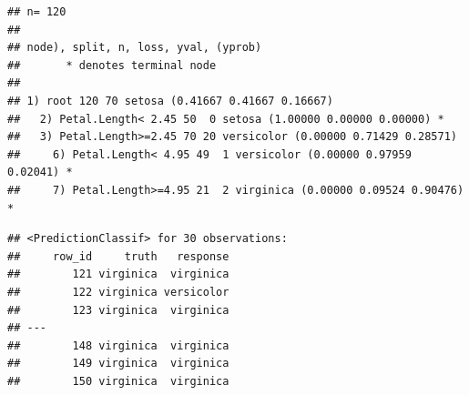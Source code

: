 \documentclass[]{article}
\newenvironment{Shaded}{\begin{snugshade}}{\end{snugshade}}
\newcommand{\CommentTok}[1]{\textcolor[rgb]{0.56,0.35,0.01}{\textit{#1}}}
\newcommand{\DataTypeTok}[1]{\textcolor[rgb]{0.13,0.29,0.53}{#1}}
\newcommand{\DecValTok}[1]{\textcolor[rgb]{0.00,0.00,0.81}{#1}}
\newcommand{\KeywordTok}[1]{\textcolor[rgb]{0.13,0.29,0.53}{\textbf{#1}}}
\newcommand{\NormalTok}[1]{#1}
\newcommand{\OperatorTok}[1]{\textcolor[rgb]{0.81,0.36,0.00}{\textbf{#1}}}
\newcommand{\StringTok}[1]{\textcolor[rgb]{0.31,0.60,0.02}{#1}}
\renewenvironment{Shaded} {\begin{snugshade}\small} {\end{snugshade}}
\begin{document}
\begin{Shaded}
\end{Shaded}

\begin{verbatim}
## n= 120 
## 
## node), split, n, loss, yval, (yprob)
##       * denotes terminal node
## 
## 1) root 120 70 setosa (0.41667 0.41667 0.16667)  
##   2) Petal.Length< 2.45 50  0 setosa (1.00000 0.00000 0.00000) *
##   3) Petal.Length>=2.45 70 20 versicolor (0.00000 0.71429 0.28571)  
##     6) Petal.Length< 4.95 49  1 versicolor (0.00000 0.97959 0.02041) *
##     7) Petal.Length>=4.95 21  2 virginica (0.00000 0.09524 0.90476) *
\end{verbatim}

\begin{Shaded}
\end{Shaded}

\begin{verbatim}
## <PredictionClassif> for 30 observations:
##     row_id     truth   response
##        121 virginica  virginica
##        122 virginica versicolor
##        123 virginica  virginica
## ---                            
##        148 virginica  virginica
##        149 virginica  virginica
##        150 virginica  virginica
\end{verbatim}

\begin{Shaded}
\end{Shaded}
\end{document}
